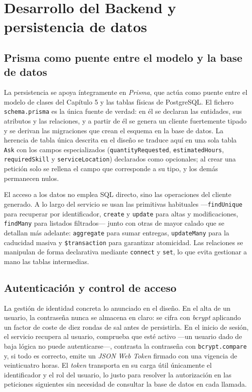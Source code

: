 \documentclass[11pt,oneside,spanish,listoffigures,listoftables]{tfgetsinf}
\begin{document}
\section{Desarrollo del Backend y persistencia de datos}

\subsection{Prisma como puente entre el modelo y la base de datos}

La persistencia se apoya íntegramente en \textit{Prisma}, que actúa como puente entre el modelo de clases del Capítulo 5 y las tablas físicas de PostgreSQL. El fichero \texttt{schema.prisma} es la única fuente de verdad: en él se declaran las entidades, sus atributos y las relaciones, y a partir de él se genera un cliente fuertemente tipado y se derivan las migraciones que crean el esquema en la base de datos. La herencia de tabla única descrita en el diseño se traduce aquí en una sola tabla \texttt{Ask} con los campos especializados (\texttt{quantityRequested}, \texttt{estimatedHours}, \texttt{requiredSkill} y \texttt{serviceLocation}) declarados como opcionales; al crear una petición solo se rellena el campo que corresponde a su tipo, y los demás permanecen nulos.

El acceso a los datos no emplea SQL directo, sino las operaciones del cliente generado. A lo largo del servicio se usan las primitivas habituales —\texttt{findUnique} para recuperar por identificador, \texttt{create} y \texttt{update} para altas y modificaciones, \texttt{findMany} para listados filtrados— junto con otras de mayor calado que se detallan más adelante: \texttt{aggregate} para sumar entregas, \texttt{updateMany} para la caducidad masiva y \texttt{\$transaction} para garantizar atomicidad. Las relaciones se manipulan de forma declarativa mediante \texttt{connect} y \texttt{set}, lo que evita gestionar a mano las tablas intermedias.

\subsection{Autenticación y control de acceso}

La gestión de identidad concreta lo anunciado en el diseño. En el alta de un usuario, la contraseña nunca se almacena en claro: se cifra con \textit{bcrypt} aplicando un factor de coste de diez rondas de sal antes de persistirla. En el inicio de sesión, el servicio recupera al usuario, comprueba que esté activo —un usuario dado de baja lógica no puede autenticarse—, contrasta la contraseña con \texttt{bcrypt.compare} y, si todo es correcto, emite un \textit{JSON Web Token} \cite{jwt_rfc} firmado con una vigencia de veinticuatro horas. El \textit{token} transporta en su carga útil únicamente el identificador y el rol del usuario, lo justo para resolver la autorización en las peticiones siguientes sin necesidad de consultar la base de datos en cada llamada.
\end{document}
